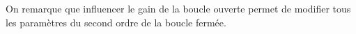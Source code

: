 On remarque que influencer le gain de la boucle ouverte permet de modifier
tous les paramètres du second ordre de la boucle fermée.









%




